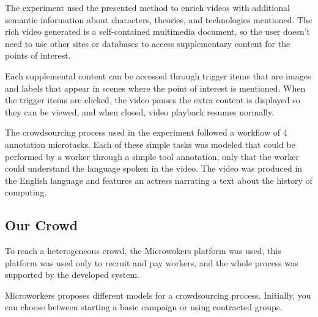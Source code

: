The experiment used the presented method to enrich videos with additional semantic information about characters, theories, and technologies mentioned. The rich video generated is a self-contained multimedia document, so the user doesn't need to use other sites or databases to access supplementary content for the points of interest.

Each supplemental content can be accessed through trigger items that are images and labels that appear in scenes where the point of interest is mentioned. When the trigger items are clicked, the video pauses the extra content is displayed so they can be viewed, and when closed, video playback resumes normally.

The crowdsourcing process used in the experiment followed a workflow of 4 annotation microtasks. Each of these simple tasks was modeled that could be performed by a worker through a simple tool annotation, only that the worker could understand the language spoken in the video. The video was produced in the English language and features an actress narrating a text about the history of computing.
\pagebreak

\subsection{Our Crowd}
To reach a heterogeneous crowd, the Microwokers \cite{microworkers} platform was used, this platform was used only to recruit and pay workers, and the whole process was supported by the developed system.

Microworkers proposes different models for a crowdsourcing process. Initially, you can choose between starting a basic campaign or using contracted groups.


